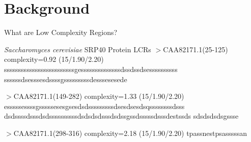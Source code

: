\documentclass{beamer}
\begin{document}
	
	\section{Background}
	\begin{frame}{What are Low Complexity Regions?}
		\label{link1}
		
		\begin{block}{\textit{Saccharomyces cerevisiae} SRP40 Protein LCRs}
			$>$CAA82171.1(25-125) complexity=0.92 (15/1.90/2.20)
			sssssssssssssssssssssssssgessssssssssssssdssdssdsessssssssss
			ssssssdsesssesdssssgsssssssssdesssesesede \newline
			
			$>$CAA82171.1(149-282) complexity=1.33 (15/1.90/2.20)
			esssssessssgsssssesesgsesdsdsssssssssdsesdsesdsqssssssssdsss
			dsdssssdsssdsdssssssssssdsdsdsdsssdsdssgssdsssssdsssdestssds
			sdsdsdsdsgssse \newline
			
			$>$CAA82171.1(298-316) complexity=2.18 (15/1.90/2.20)
			tpassnestpsasssssan
			
		\end{block}		
		
	\end{frame}

		
		
\end{document}
